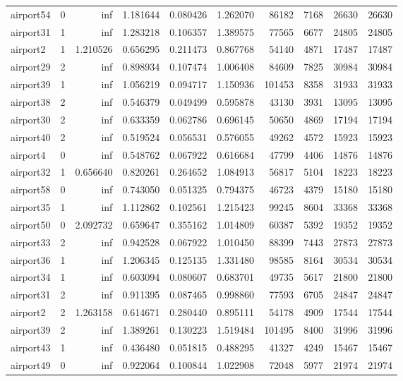\begin{longtable}{|l|r|r|r|r|r|r|r|r|r|}
airport54 & 0 & inf & 1.181644 & 0.080426 & 1.262070 & 86182 & 7168 & 26630 & 26630 \\
airport31 & 1 & inf & 1.283218 & 0.106357 & 1.389575 & 77565 & 6677 & 24805 & 24805 \\
airport2 & 1 & 1.210526 & 0.656295 & 0.211473 & 0.867768 & 54140 & 4871 & 17487 & 17487 \\
airport29 & 2 & inf & 0.898934 & 0.107474 & 1.006408 & 84609 & 7825 & 30984 & 30984 \\
airport39 & 1 & inf & 1.056219 & 0.094717 & 1.150936 & 101453 & 8358 & 31933 & 31933 \\
airport38 & 2 & inf & 0.546379 & 0.049499 & 0.595878 & 43130 & 3931 & 13095 & 13095 \\
airport30 & 2 & inf & 0.633359 & 0.062786 & 0.696145 & 50650 & 4869 & 17194 & 17194 \\
airport40 & 2 & inf & 0.519524 & 0.056531 & 0.576055 & 49262 & 4572 & 15923 & 15923 \\
airport4 & 0 & inf & 0.548762 & 0.067922 & 0.616684 & 47799 & 4406 & 14876 & 14876 \\
airport32 & 1 & 0.656640 & 0.820261 & 0.264652 & 1.084913 & 56817 & 5104 & 18223 & 18223 \\
airport58 & 0 & inf & 0.743050 & 0.051325 & 0.794375 & 46723 & 4379 & 15180 & 15180 \\
airport35 & 1 & inf & 1.112862 & 0.102561 & 1.215423 & 99245 & 8604 & 33368 & 33368 \\
airport50 & 0 & 2.092732 & 0.659647 & 0.355162 & 1.014809 & 60387 & 5392 & 19352 & 19352 \\
airport33 & 2 & inf & 0.942528 & 0.067922 & 1.010450 & 88399 & 7443 & 27873 & 27873 \\
airport36 & 1 & inf & 1.206345 & 0.125135 & 1.331480 & 98585 & 8164 & 30534 & 30534 \\
airport34 & 1 & inf & 0.603094 & 0.080607 & 0.683701 & 49735 & 5617 & 21800 & 21800 \\
airport31 & 2 & inf & 0.911395 & 0.087465 & 0.998860 & 77593 & 6705 & 24847 & 24847 \\
airport2 & 2 & 1.263158 & 0.614671 & 0.280440 & 0.895111 & 54178 & 4909 & 17544 & 17544 \\
airport39 & 2 & inf & 1.389261 & 0.130223 & 1.519484 & 101495 & 8400 & 31996 & 31996 \\
airport43 & 1 & inf & 0.436480 & 0.051815 & 0.488295 & 41327 & 4249 & 15467 & 15467 \\
airport49 & 0 & inf & 0.922064 & 0.100844 & 1.022908 & 72048 & 5977 & 21974 & 21974 \\

\end{longtable}
